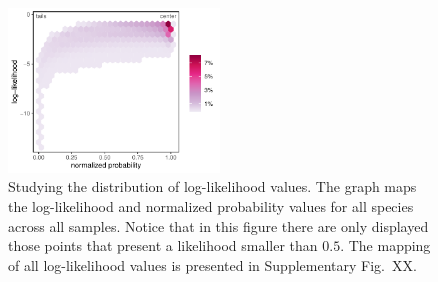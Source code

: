 \documentclass[11pt, a4paper]{article}
\begin{document}
\begin{figure}[ht]
  \centering
    \includegraphics[width=0.5\textwidth]{figures/loglik-notshow-bin}
    	  \vspace{0.1cm}
	   \caption{Studying the distribution of log-likelihood values. The graph maps the log-likelihood and normalized probability values for all species across all samples. Notice that in this figure there are only displayed those points that present a likelihood smaller than $0.5$. The mapping of all log-likelihood values is presented in Supplementary Fig.~XX.}
      \label{fig:loglik}
\end{figure}




\end{document}
